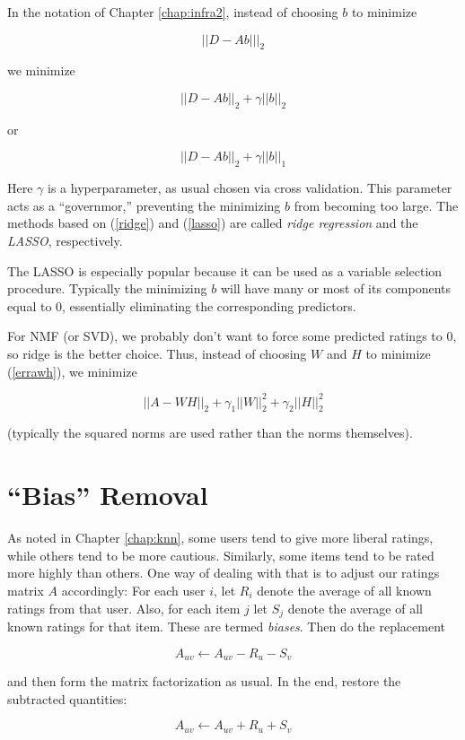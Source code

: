 In the notation of Chapter \ref{chap:infra2}, instead of choosing $b$ to
minimize

\begin{equation}
||D - Ab|||_2
\end{equation}

we minimize

\begin{equation}
\label{ridge}
||D - Ab||_2 + \gamma ||b||_2
\end{equation}

or

\begin{equation}
\label{lasso}
||D - Ab||_2 + \gamma ||b||_1
\end{equation}

Here $\gamma$ is a hyperparameter, as usual chosen via cross validation.
This parameter acts as a ``governmor,'' preventing the minimizing $b$
from becoming too large.  The methods based on (\ref{ridge}) and
(\ref{lasso}) are called \textit{ridge regression} and the
\textit{LASSO}, respectively.

The LASSO is especially popular because it can be used as a variable
selection procedure.  Typically the minimizing $b$ will have many or
most of its components equal to 0, essentially eliminating the
corresponding predictors.

For NMF (or SVD), we probably don't want to force some predicted ratings
to 0, so ridge is the better choice.  Thus, instead of choosing $W$ and
$H$ to minimize (\ref{errawh}), we minimize

\begin{equation}
||A - WH||_2 + \gamma_1 ||W||_2^2 + \gamma_2 ||H||_2^2
\end{equation}

(typically the squared norms are used rather than the norms themselves).

\section{``Bias'' Removal}

As noted in Chapter \ref{chap:knn}, some users tend to give more liberal
ratings, while others tend to be more cautious.  Similarly, some items
tend to be rated more highly than others.  One way of dealing with
that is to adjust our ratings matrix $A$ accordingly:  For each user
$i$, let $R_i$ denote the average of all known ratings from that user.
Also, for each item $j$ let $S_j$ denote the average of all known ratings
for that item.  These are termed \textit{biases}. Then do the replacement

\begin{equation}
A_{uv} \leftarrow A_{uv} - R_u - S_v
\end{equation}

and then form the matrix factorization as usual.  In the end, restore
the subtracted quantities:

\begin{equation}
A_{uv} \leftarrow A_{uv} + R_u + S_v
\end{equation}

